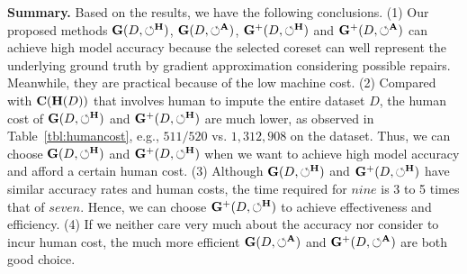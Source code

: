 \noindent \textbf{Summary.} 
Based on the results, we have the following conclusions.
(1) Our proposed methods $\mathbf{G}(D,\circlearrowleft^\mathbf{H})$, $\mathbf{G}(D,\circlearrowleft^\mathbf{A})$, $\mathbf{G}^+(D,\circlearrowleft^\mathbf{H})$ and $\mathbf{G}^+(D,\circlearrowleft^\mathbf{A})$ can achieve high model accuracy because the selected coreset can well represent the underlying ground truth by gradient approximation considering possible repairs. Meanwhile, they are practical because of the low machine cost. (2) Compared with $\mathbf{C}(\mathbf{H}(D))$ that involves human to impute the entire dataset $D$, the human cost of $\mathbf{G}(D,\circlearrowleft^\mathbf{H})$ and $\mathbf{G}^+(D,\circlearrowleft^\mathbf{H})$ are much lower, as observed in Table~\ref{tbl:humancost}, e.g., $511/520$ vs. $1,312,908$ on the \imdbl dataset. Thus, we can choose $\mathbf{G}(D,\circlearrowleft^\mathbf{H})$ and $\mathbf{G}^+(D,\circlearrowleft^\mathbf{H})$ when we want to achieve high model accuracy and afford a certain human cost. (3) Although $\mathbf{G}(D,\circlearrowleft^\mathbf{H})$ and $\mathbf{G}^+(D,\circlearrowleft^\mathbf{H})$ have similar accuracy rates and human costs, the time required for $nine$ is 3 to 5 times that of $seven$. Hence, we can choose $\mathbf{G}^+(D,\circlearrowleft^\mathbf{H})$ to achieve effectiveness and efficiency. (4) 
If we neither care very much about the accuracy nor consider to incur human cost, the much more efficient $\mathbf{G}(D,\circlearrowleft^\mathbf{A})$ and $\mathbf{G}^+(D,\circlearrowleft^\mathbf{A})$ are both good choice.





